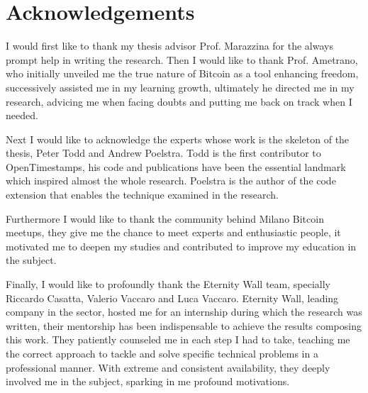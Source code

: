 \chapter{Acknowledgements}
\label{chpr:acknowledgement}

I would first like to thank my thesis advisor Prof. Marazzina for the always prompt help in writing the research.
Then I would like to thank Prof. Ametrano, who initially unveiled me the true nature of Bitcoin as a tool enhancing freedom, successively assisted me in my learning growth, ultimately he directed me in my research, advicing me when facing doubts and putting me back on track when I needed. 

Next I would like to acknowledge the experts whose work is the skeleton of the thesis, Peter Todd and Andrew Poelstra.
Todd is the first contributor to OpenTimestamps, his code and publications have been the essential landmark which inspired almost the whole research.
Poelstra is the author of the code extension that enables the technique examined in the research.

Furthermore I would like to thank the community behind Milano Bitcoin meetups, they give me the chance to meet experts and enthusiastic people, it motivated me to deepen my studies and contributed to improve my education in the subject.

Finally, I would like to profoundly thank the Eternity Wall team, specially Riccardo Casatta, Valerio Vaccaro and Luca Vaccaro.
Eternity Wall, leading company in the sector, hosted me for an internship during which the research was written, 
their mentorship has been indispensable to achieve the results composing this work.
They patiently counseled me in each step I had to take, teaching me the correct approach to tackle and solve specific technical problems in a professional manner. 
With extreme and consistent availability, they deeply involved me in the subject, sparking in me profound motivations.